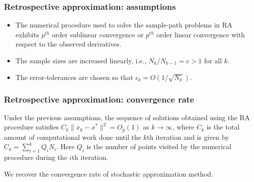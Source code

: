 \documentclass{beamer}
\begin{document}
\begin{frame}
\frametitle{Retrospective approximation: assumptions}

\begin{itemize}
\item
The numerical procedure used to solve the sample-path problems in RA exhibits $p^{th}$ order sublinear convergence or $p^{th}$ order linear convergence with respect to the observed derivatives.
\item
The sample sizes are increased linearly, i.e., $N_k / N_{k - 1} = c > 1$ for all $k$.
\item
The error-tolerances are chosen so that
$\epsilon_k= O(1/\sqrt{N_k})$.
\end{itemize}

\end{frame}

\begin{frame}
\frametitle{Retrospective approximation: convergence rate}

Under the previous assumptions, the sequence of solutions obtained using the RA procedure satisfies $C_k \| x_k - x^* \|^2 = O_p(1)$ as $k \rightarrow \infty$, where $C_k$ is the total amount of computational work done until the $k$th iteration and is given by $C_k = \sum^k_{i = 1} Q_iN_i$.
Here $Q_i$ is the number of points visited by the numerical procedure during the $i$th iteration.

\mbox{}

We recover the convergence rate of stochastic approximation method.

\end{frame}



\end{document}
